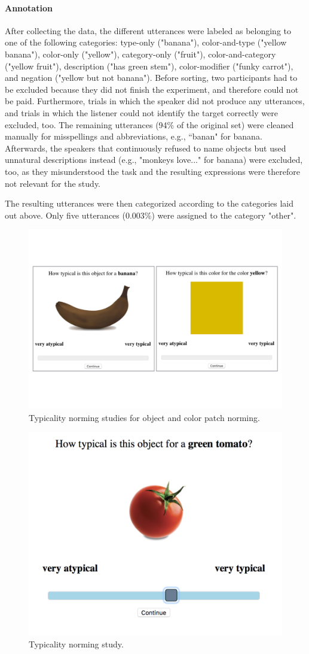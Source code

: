 \documentclass[10pt,letterpaper]{article}
\begin{document}
\paragraph{Annotation}
After collecting the data, the different utterances were labeled as belonging to one of the following categories: type-only ("banana"), color-and-type ("yellow banana"),  color-only ("yellow"), category-only ("fruit"), color-and-category ("yellow fruit"), description ("has green stem"), color-modifier ("funky carrot"), and negation ("yellow but not banana"). Before sorting, two participants had to be excluded because they did not finish the experiment, and therefore could not be paid. Furthermore, trials in which the speaker did not produce any utterances, and trials in which the listener could not identify the target correctly were excluded, too. The remaining utterances (94\% of the original set) were cleaned manually for misspellings and abbreviations, e.g., ``banan" for banana. Afterwards, the speakers that continuously refused to name objects but used unnatural descriptions instead (e.g., "monkeys love..." for banana) were excluded, too, as they misunderstood the task and the resulting expressions were therefore not relevant for the study.

The resulting utterances were then categorized according to the categories laid out above. Only five utterances (0.003\%) were assigned to the category "other".

\begin{figure}[bt!]
	\centering
	\includegraphics[width=.5\textwidth]{graphs/design_2}
	\caption{Typicality norming studies for object and color patch norming.
	}
	\label{fig:design_2}
\end{figure}

\begin{figure}[bt!]
	\centering
	\includegraphics[width=.5\textwidth]{graphs/typ_norm_full_2}
	\caption{Typicality norming study.
	}
	\label{fig:typ_norm_full_2}
\end{figure}
\end{document}
